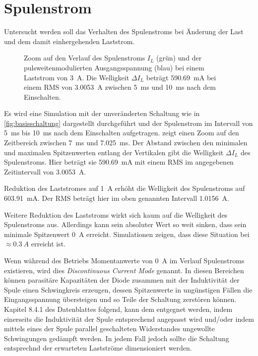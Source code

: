 	\section{Spulenstrom}
		Untersucht werden soll das Verhalten des Spulenstroms bei Änderung der Last und dem damit einhergehenden Laststrom.
		\begin{figure}[h]
			\centering
			
			\caption[Zoom auf den Verlauf des Spulenstroms \(I_L\)]{Zoom auf den Verlauf des Spulenstroms \(I_L\) (grün) und der pulsweitenmodulierten Ausgangsspannung (blau) bei einem Laststrom von \SI{3}{A}. Die Welligkeit \(\Delta I_L\) beträgt
			\SI{590,69}{mA} bei einem RMS von \SI{3,0053}{A} zwischen \SI{5}{ms} und \SI{10}{ms} nach dem Einschalten.}
			\label{fig:spulenstrom}
		\end{figure}%
		Es wird eine Simulation mit der unveränderten Schaltung wie in \cref{fig:basisschaltung} dargestellt durchgeführt und der Spulenstrom
		im Intervall von \SI{5}{ms} bis \SI{10}{ms} nach dem Einschalten aufgetragen.
		 zeigt einen Zoom auf den
		Zeitbereich zwischen \SI{7}{ms} und \SI{7,025}{ms}. Der Abstand zwischen den minimalen und maximalen Spitzenwerten entlang der Vertikalen 
		gibt die Welligkeit \(\Delta I_L\) des Spulenstroms. Hier beträgt sie \SI{590,69}{mA} mit einem RMS im angegebenen Zeitintervall
		von \SI{3,0053}{A}.\par
		Reduktion des Laststromes auf \SI{1}{A} erhöht die Welligkeit des Spulenstroms auf \SI{603,91}{mA}. Der RMS beträgt hier im oben genannten Intervall
		\SI{1,0156}{A}.\par\medskip
		Weitere Reduktion des Laststroms wirkt sich kaum auf die Welligkeit des Spulenstroms aus. Allerdings kann sein absoluter Wert
		so weit sinken, dass sein minimale Spitzenwert \SI{0}{A} erreicht. Simulationen zeigen, dass diese Situation bei \(\approx \SI{0.3}{A}\)
		erreicht ist.\par
		Wenn während des Betriebs Momentanwerte von \SI{0}{A} im Verlauf Spulenstroms existieren, wird dies \textit{Discontinuous Current Mode} genannt.
		In diesen Bereichen können parasitäre Kapazitäten der Diode zusammen mit der Induktivität der Spule einen Schwingkreis erzeugen, dessen
		Spitzenwerte in ungünstigen Fällen die Eingangsspannung übersteigen und so Teile der Schaltung zerstören können. Kapitel 8.4.1 des
		Datenblattes folgend, kann dem entgegnet werden, indem einerseits die Induktivität der Spule entsprechend angepasst wird und/oder
		indem mittels eines der Spule parallel geschalteten Widerstandes ungewollte Schwingungen gedämpft werden. In jedem Fall jedoch
		sollte die Schaltung entsprechnd der erwarteten Lastströme dimensioniert werden.
